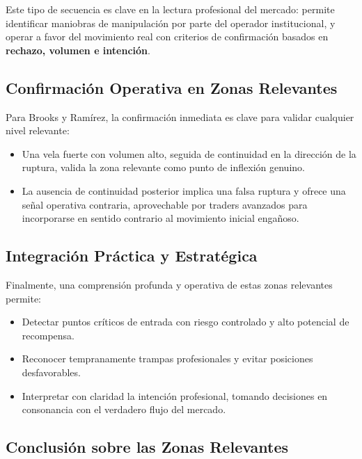 \noindent
Este tipo de secuencia es clave en la lectura profesional del mercado: permite identificar maniobras de manipulaci\'on por parte del operador institucional, y operar a favor del movimiento real con criterios de confirmaci\'on basados en \textbf{rechazo, volumen e intenci\'on}.


\subsection{Confirmaci\'on Operativa en Zonas Relevantes}

Para Brooks y Ram\'irez, la confirmaci\'on inmediata es clave para validar cualquier nivel relevante:

\begin{itemize}
    \item Una vela fuerte con volumen alto, seguida de continuidad en la direcci\'on de la ruptura, valida la zona relevante como punto de inflexi\'on genuino.
    
    \item La ausencia de continuidad posterior implica una falsa ruptura y ofrece una se\~nal operativa contraria, aprovechable por traders avanzados para incorporarse en sentido contrario al movimiento inicial enga\~noso.
\end{itemize}

\subsection{Integraci\'on Pr\'actica y Estrat\'egica}

Finalmente, una comprensi\'on profunda y operativa de estas zonas relevantes permite:

\begin{itemize}
    \item Detectar puntos cr\'iticos de entrada con riesgo controlado y alto potencial de recompensa.
    \item Reconocer tempranamente trampas profesionales y evitar posiciones desfavorables.
    \item Interpretar con claridad la intenci\'on profesional, tomando decisiones en consonancia con el verdadero flujo del mercado.
\end{itemize}

\subsection{Conclusi\'on sobre las Zonas Relevantes}

